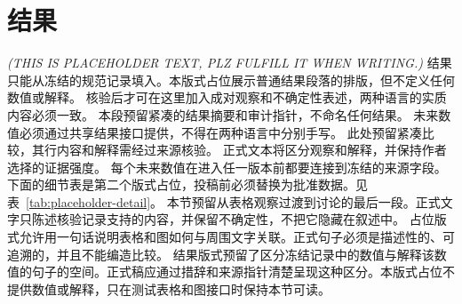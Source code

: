 \section{结果}\label{sec:results}
\textit{(THIS IS PLACEHOLDER TEXT, PLZ FULFILL IT WHEN WRITING.)}
结果只能从冻结的规范记录填入。本版式占位展示普通结果段落的排版，但不定义任何数值或解释。
核验后才可在这里加入成对观察和不确定性表述，两种语言的实质内容必须一致。
本段预留紧凑的结果摘要和审计指针，不命名任何结果。
未来数值必须通过共享结果接口提供，不得在两种语言中分别手写。
此处预留紧凑比较，其行内容和解释需经过来源核验。
正式文本将区分观察和解释，并保持作者选择的证据强度。
每个未来数值在进入任一版本前都要连接到冻结的来源字段。
下面的细节表是第二个版式占位，投稿前必须替换为批准数据。见表~\ref{tab:placeholder-detail}。
本节预留从表格观察过渡到讨论的最后一段。正式文字只陈述核验记录支持的内容，并保留不确定性，不把它隐藏在叙述中。
占位版式允许用一句话说明表格和图如何与周围文字关联。正式句子必须是描述性的、可追溯的，并且不能编造比较。
结果版式预留了区分冻结记录中的数值与解释该数值的句子的空间。正式稿应通过措辞和来源指针清楚呈现这种区分。本版式占位不提供数值或解释，只在测试表格和图接口时保持本节可读。

